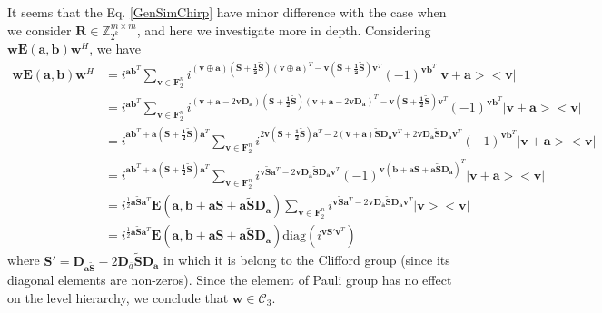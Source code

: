 \noindent It seems that the Eq. \eqref{GenSimChirp} have minor difference with the case when we consider $\mathbf{R}\in\mathbb{Z}_{2^k}^{m\times m}$, and here we investigate more in depth. Considering $\mathbf{w E}\left(\mathbf{a,b}\right) \mathbf{w}^H$, we have
\begin{align}
	\mathbf{w E}\left(\mathbf{a, b}\right) \mathbf{w}^H &=i^{\mathbf{a b}^T} \sum_{\mathbf{v}\in \mathbf{F}_2^n}{i^{\left(\mathbf{v}\oplus \mathbf{a}\right)\left(\mathbf{S+\frac{1}{2}\tilde{S}}\right)\left(\mathbf{v}\oplus \mathbf{a}\right)^T-\mathbf{v}\left(\mathbf{S+\frac{1}{2}\tilde{S}}\right)\mathbf{v}^T} (-1)^{\mathbf{v b}^T} |\mathbf{v+a}><\mathbf{v}|} \nonumber \\
	& =i^{\mathbf{a b}^T} \sum_{\mathbf{v} \in \mathbf{F}_2^n}{i^{\left(\mathbf{v}+ \mathbf{a}-2\mathbf{v}\mathbf{D}_\mathbf{a}\right)\left(\mathbf{S+\frac{1}{2}\tilde{S}}\right)\left(\mathbf{v}+ \mathbf{a}-2\mathbf{v}\mathbf{D}_\mathbf{a}\right)^T-\mathbf{v}\left(\mathbf{S+\frac{1}{2}\tilde{S}}\right)\mathbf{v}^T} (-1)^{\mathbf{v b}^T} |\mathbf{v+a}><\mathbf{v}|} \nonumber \\
	&= i^{\mathbf{a b}^T+\mathbf{a} \left(\mathbf{S+\frac{1}{2}\tilde{S}}\right)\mathbf{a}^T}\sum_{\mathbf{v}\in \mathbf{F}_2^n}{i^{2\mathbf{v} \left(\mathbf{S+\frac{1}{2}\tilde{S}}\right)\mathbf{a}^T-2\left(\mathbf{v+a}\right)\mathbf{\tilde{S}D}_\mathbf{a} \mathbf{v}^T+2\mathbf{v}\mathbf{D}_\mathbf{a} \mathbf{\tilde{S}}\mathbf{D}_\mathbf{a} \mathbf{v}^T  } (-1)^{\mathbf{v b}^T} |\mathbf{v+a}><\mathbf{v}|} \nonumber \\
	&= i^{\mathbf{a b}^T+\mathbf{a} \left(\mathbf{S+\frac{1}{2}\tilde{S}}\right)\mathbf{a}^T}\sum_{\mathbf{v}\in \mathbf{F}_2^n}{i^{\mathbf{v} \mathbf{\tilde{S}} \mathbf{a}^T -2\mathbf{v}\mathbf{D}_{\mathbf{\overline{a}}}\mathbf{\tilde{S}D}_\mathbf{a} \mathbf{v}^T} (-1)^{\mathbf{v}\left(\mathbf{b+aS}+\mathbf{a\tilde{S}}\mathbf{D}_\mathbf{a}\right)^T} |\mathbf{v+a}><\mathbf{v}|} \nonumber \\
	&= i^{\frac{1}{2}\mathbf{a} \mathbf{\tilde{S}}\mathbf{a}^T} \mathbf{E}\left(\mathbf{a, b+aS+a\tilde{S}\mathbf{D}_\mathbf{a}}\right) \sum_{\mathbf{v}\in \mathbf{F}_2^n}{i^{\mathbf{v} \mathbf{\tilde{S}} \mathbf{a}^T-2\mathbf{v}\mathbf{D}_{\mathbf{\overline{a}}}\mathbf{\tilde{S}D}_\mathbf{a} \mathbf{v}^T} |\mathbf{v}><\mathbf{v}|} \nonumber \\
	& = i^{\frac{1}{2}\mathbf{a} \mathbf{\tilde{S}}\mathbf{a}^T} \mathbf{E}\left(\mathbf{a, b+aS+a\tilde{S}\mathbf{D}_\mathbf{a}}\right)\text{diag}\left(i^{\mathbf{v}\mathbf{S}'\mathbf{v}^T}\right)
\end{align} 
where $\mathbf{S}'=\mathbf{D}_\mathbf{a\tilde{S}}-2\mathbf{D}_{\overline{a}}\mathbf{\tilde{S}}\mathbf{D}_\mathbf{a}$ in which it is belong to the Clifford group (since its diagonal elements are non-zeros). Since the element of Pauli group has no effect on the level hierarchy, we conclude that $\mathbf{w}\in\mathcal{C}_3$.

